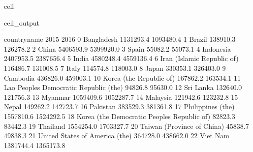 \documentclass[letterpaper,10pt,english]{jupyterBook}
\begin{document}
\begin{sphinxuseclass}{cell}
\begin{sphinxVerbatimOutput}
\begin{sphinxuseclass}{cell_output}
\begin{sphinxVerbatim}[commandchars=\\\{\}]
                                   country\PYGZus{}name       2015       2016  \PYGZbs{}
0                                    Bangladesh  1131293.4  1093480.4   
1                                        Brazil   138910.3   126278.2   
2                                         China  5406593.9  5399920.0   
3                                         Spain    55082.2    55073.1   
4                                     Indonesia  2407953.5  2387656.4   
5                                         India  4580248.4  4559136.4   
6                    Iran (Islamic Republic of)   116486.7   131008.5   
7                                         Italy   114574.8   118003.0   
8                                         Japan   330353.1   326403.0   
9                                      Cambodia   436826.0   459003.1   
10                      Korea (the Republic of)   167862.2   163534.1   
11       Lao People\PYGZsq{}s Democratic Republic (the)    94826.8    95630.0   
12                                    Sri Lanka   132640.0   121756.3   
13                                      Myanmar  1059409.6  1052287.7   
14                                     Malaysia   121942.6   123232.8   
15                                        Nepal   149262.2   142723.7   
16                                     Pakistan   383529.3   381361.8   
17                            Philippines (the)  1557810.6  1524292.5   
18  Korea (the Democratic People\PYGZsq{}s Republic of)    82823.3    83442.3   
19                                     Thailand  1554254.0  1703327.7   
20                   Taiwan (Province of China)    45838.7    49838.3   
21               United States of America (the)   364728.0   438662.0   
22                                     Viet Nam  1381744.4  1365173.8   


\end{sphinxVerbatim}
\end{sphinxuseclass}
\end{sphinxVerbatimOutput}
\end{sphinxuseclass}
\end{document}
